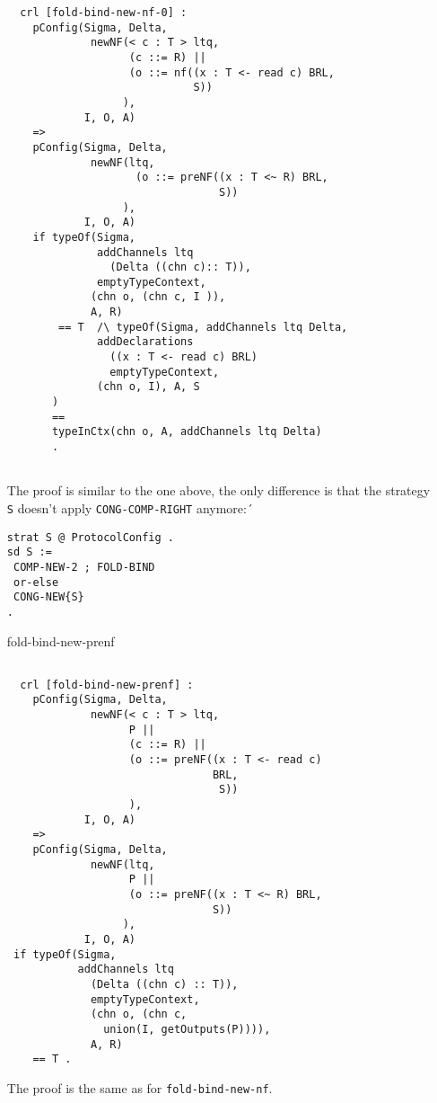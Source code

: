 \documentclass{article}
\begin{document}
\begin{itemize}
\begin{lstlisting}
  crl [fold-bind-new-nf-0] :
    pConfig(Sigma, Delta, 
             newNF(< c : T > ltq, 
                   (c ::= R) || 
                   (o ::= nf((x : T <- read c) BRL, 
                             S))
                  ),
            I, O, A)
    => 
    pConfig(Sigma, Delta, 
             newNF(ltq, 
                    (o ::= preNF((x : T <~ R) BRL, 
                                 S))
                  ),
            I, O, A) 
    if typeOf(Sigma, 
              addChannels ltq 
                (Delta ((chn c):: T)), 
              emptyTypeContext, 
             (chn o, (chn c, I )), 
             A, R) 
        == T  /\ typeOf(Sigma, addChannels ltq Delta, 
              addDeclarations 
                ((x : T <- read c) BRL) 
                emptyTypeContext,
              (chn o, I), A, S
       ) 
       == 
       typeInCtx(chn o, A, addChannels ltq Delta) 
       .
       
    \end{lstlisting}
    
   The proof is similar to the one above, the only difference is that
   the strategy \verb+S+ doesn't apply \verb+CONG-COMP-RIGHT+ anymore:´
\begin{lstlisting}
strat S @ ProtocolConfig . 
sd S := 
 COMP-NEW-2 ; FOLD-BIND
 or-else
 CONG-NEW{S}
.
\end{lstlisting}  

\item[fold-bind-new-prenf]
 \begin{lstlisting}       
            
  crl [fold-bind-new-prenf] :
    pConfig(Sigma, Delta, 
             newNF(< c : T > ltq,
                   P || 
                   (c ::= R) || 
                   (o ::= preNF((x : T <- read c) 
                                BRL, 
                                 S))
                   ),
            I, O, A)
    => 
    pConfig(Sigma, Delta, 
             newNF(ltq, 
                   P || 
                   (o ::= preNF((x : T <~ R) BRL, 
                                S))
                  ),
            I, O, A) 
 if typeOf(Sigma, 
           addChannels ltq 
             (Delta ((chn c) :: T)), 
             emptyTypeContext, 
             (chn o, (chn c, 
               union(I, getOutputs(P)))), 
             A, R) 
    == T .        
                \end{lstlisting}
                
   The proof is the same as for \verb+fold-bind-new-nf+.             


\end{itemize}
\end{document}
